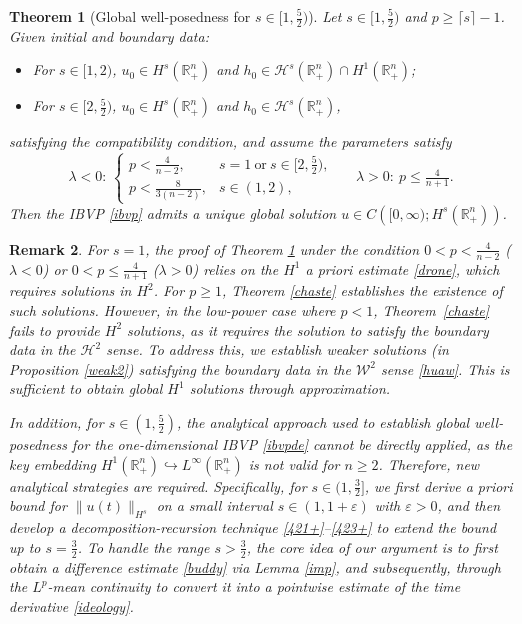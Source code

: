 \documentclass[preprint,compress,12pt]{elsarticle}
\newtheorem{theorem}{Theorem}[section]
\newtheorem{remark}[theorem]{Remark}
\numberwithin{equation}{section}
\begin{document}
\begin{theorem}[Global well-posedness for $s \in [1, \frac{5}{2})$]\label{global}
	Let $s\in [1, \frac{5}{2})$ and $p\geq \lceil s\rceil-1$. Given initial and boundary data:
		\begin{itemize}
		\item For $s\in [1,2)$, $u_{0}\in H^{s}(\mathbb{R}^{n}_{+})$  and $h_{0}\in\mathcal{H}^{s}(\mathbb{R}^{n}_{+})\cap H^{1}(\mathbb{R}^{n}_{+})$;
		\item For $s\in [2,\frac{5}{2})$, $u_{0}\in H^{s}(\mathbb{R}^{n}_{+})$ and $h_{0}\in\mathcal{H}^{s}(\mathbb{R}^{n}_{+})$,
		\end{itemize}
	satisfying the compatibility condition, and assume the parameters satisfy
	\begin{equation}
		\lambda<0:\, \begin{cases}
			p<\frac{4}{n-2}, & s=1\ \text{or} \ s\in[2,\frac{5}{2}),\\ p<\frac{8}{3(n-2)}, &s\in(1,2),
		\end{cases}\;
		\quad\ \lambda>0: \ p\leq \tfrac{4}{n+1}.
	\end{equation}
	Then the IBVP \eqref{ibvp} admits a unique global solution $u \in C\left([0,\infty); H^s(\mathbb{R}^n_{+})\right)$.
\end{theorem}	


\begin{remark}\label{remaa}
 For $s=1$,	the proof of Theorem \ref{global}  under the condition $0<p< \frac{4}{n-2}$  ($\lambda<0$) or $0<p\leq \frac{4}{n+1}$ ($\lambda>0$)	relies on  the  $H^1$  a priori estimate \eqref{drone}, which requires solutions in $H^{2}$.
	For $p\geq1$, Theorem \ref{chaste} establishes the existence of such solutions. However, in the low-power case where $p<1$, Theorem~\ref{chaste} fails to provide  $H^2$  solutions, as it requires the solution  to satisfy the boundary data in the $\mathcal{H}^2$  sense. To address this, we establish  weaker solutions (in Proposition \ref{weak2}) satisfying the boundary data  in the $\mathcal{W}^2$  sense \eqref{huaw}. This is sufficient to obtain global $H^1$ solutions through approximation.

In addition, for $s\in(1,\frac{5}{2})$, the analytical approach \cite{figment} used to establish global well-posedness for the one-dimensional IBVP \eqref{ibvpde} cannot be directly applied, as the key embedding $H^{1}(\mathbb{R}^n_+) \hookrightarrow L^{\infty}(\mathbb{R}^n_+)$ is not valid for $n\geq2$. Therefore, new analytical strategies are required. Specifically, for  $s\in(1,\frac{3}{2}]$, we first derive a priori bound for  $\|u(t)\|_{H^s}$ on a small interval  $s\in(1,1+\varepsilon)$ with $\varepsilon>0$, and then develop a decomposition-recursion technique \eqref{421+}–\eqref{423+} to extend the bound up to $s=\frac{3}{2}$. To handle the range  $s>\frac{3}{2}$,  the core idea of our argument is to first obtain a difference estimate \eqref{buddy} via Lemma \ref{imp}, and subsequently,  through the $L^{p}$-mean continuity to convert it into a pointwise estimate of the time derivative  \eqref{ideology}.
\end{remark}
\end{document}
